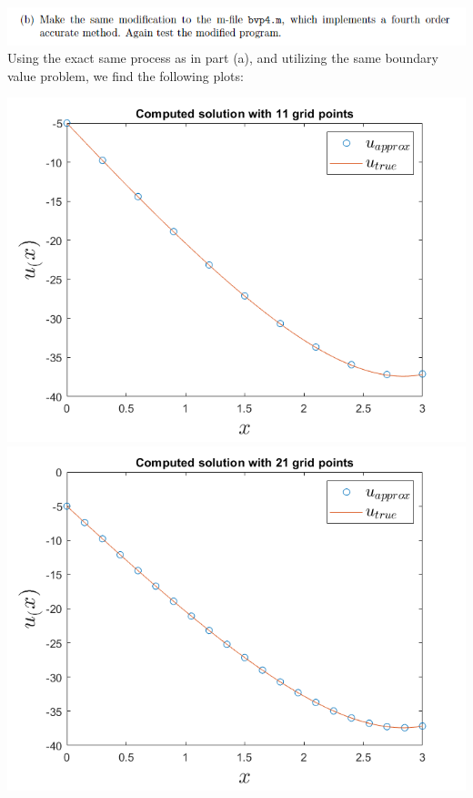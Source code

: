 \documentclass{article}
\begin{document}
\includegraphics[scale = 0.75]{prob4b.PNG}
\newline\newline
Using the exact same process as in part (a), and utilizing the same boundary value problem, we find the following plots:
\begin{center}
    \includegraphics[scale = 0.4]{bvp4Mod_11.png}
    \includegraphics[scale = 0.4]{bvp4Mod_21.png}
    \newline\newline

\end{center}
\end{document}
